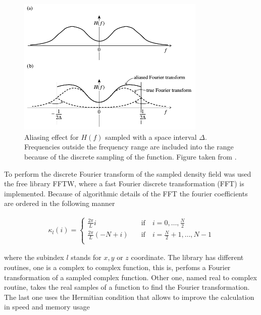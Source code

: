 \begin{figure}[htbp]
       \centering
               \includegraphics[width=0.8\textwidth]{Images/chapter3/aliasing.png}
       \caption{\small Aliasing effect for $H(f)$ sampled with a space interval $\Delta$.
       Frequencies outside the frequency range are included into the range because
       of the discrete sampling of the function. Figure taken from \cite{Press}.}
       \label{alias}
 \end{figure}

To perform the discrete Fourier transform of the sampled density field was used the free 
library FFTW, where a fast Fourier discrete transformation (FFT) is implemented.
Because of algorithmic details of the FFT the fourier coefficients are ordered in the
following manner

\begin{eqnarray*}
\kappa_l(i) =\left\{ \begin{array}{cl}
\frac{2\pi}{L}i \hspace{1em} & \mathrm{if} \hspace{1em} i = 0,\dots ,\frac{N}{2}\\
\frac{2\pi}{L}(-N+i) \hspace{1em} & \mathrm{if} \hspace{1em} i = \frac{N}{2}+1,\dots ,N-1\\
\end{array}\right.
\end{eqnarray*} 


where the subindex $l$ stands for $x,y$ or $z$ coordinate. 
The library has different routines, one is a complex to complex function, this is, perfoms a 
Fourier transformation of a sampled complex function. Other one, named real to complex routine, 
takes the real samples of a function to find the Fourier transformation. The last one 
uses the Hermitian condition that allows to improve the calculation in speed and memory 
usage


